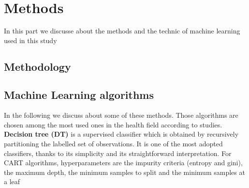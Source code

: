 \section{Methods}\label{Methods}
In this part we discusse about the methods and the technic of machine learning used in this study
\subsection{Methodology}

\subsection{Machine Learning algorithms}
In the following we discuss about some of these methods.  Those algorithms are chosen among the most used ones in the health field according to studies\cite{de2018binary,tomar2013survey}.\\
\textbf{Decision tree (DT)}\cite{Ro05} is a supervised classifier which is obtained by recursively partitioning the labelled set of observations. It is one of the most adopted classifiers, thanks to its simplicity and its straightforward interpretation. For CART algorithms, hyperparameters are the impurity criteria (entropy and gini), the maximum depth, the minimum samples to split and the minimum samples at a leaf

